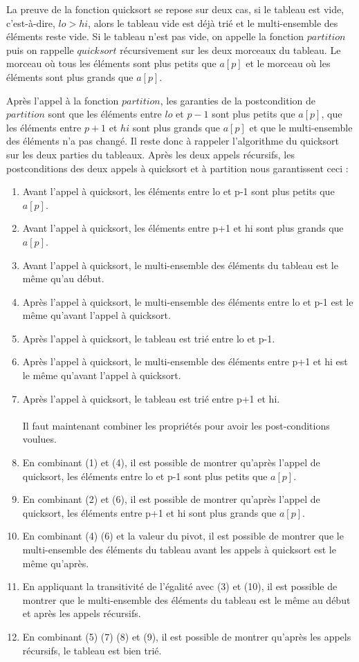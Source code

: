 \documentclass[11pt,openany]{article}
\begin{document}
		La preuve de la fonction quicksort se repose sur deux cas, si le tableau est vide, c'est-\`a-dire, $lo > hi$, alors le tableau vide est d\'ej\`a tri\'e et le multi-ensemble des \'el\'ements reste vide. Si le tableau n'est pas vide, on appelle la fonction $partition$ puis on rappelle $quicksort$ r\'ecursivement sur les deux morceaux du tableau. Le morceau o\`u tous les \'el\'ements sont plus petits que $a[p]$ et le morceau o\`u les \'el\'ements sont plus grands que $a[p]$.
		
		Apr\`es l'appel \`a la fonction $partition$, les garanties de la postcondition de $partition$ sont que les \'el\'ements entre $lo$ et $p-1$ sont plus petits que $a[p]$, que les \'el\'ements entre $p+1$ et $hi$ sont plus grands que $a[p]$ et que le multi-ensemble des \'el\'ements n'a pas chang\'e. Il reste donc \`a rappeler l'algorithme du quicksort sur les deux parties du tableaux. Apr\`es les deux appels r\'ecursifs, les postconditions des deux appels \`a quicksort et \`a partition nous garantissent ceci :
		\begin{enumerate}
			\item Avant l'appel \`a quicksort, les \'el\'ements entre lo et p-1 sont plus petits que $a[p]$.
			\item Avant l'appel \`a quicksort, les \'el\'ements entre p+1 et hi sont plus grands que $a[p]$.
			\item Avant l'appel \`a quicksort, le multi-ensemble des \'el\'ements du tableau est le m\^eme qu'au d\'ebut.
			\item Apr\`es l'appel \`a quicksort, le multi-ensemble des \'el\'ements entre lo et p-1 est le m\^eme qu'avant l'appel \`a quicksort.
			\item Apr\`es l'appel \`a quicksort, le tableau est tri\'e entre lo et p-1.
			\item Apr\`es l'appel \`a quicksort, le multi-ensemble des \'el\'ements entre p+1 et hi est le m\^eme qu'avant l'appel \`a quicksort.
			\item Apr\`es l'appel \`a quicksort, le tableau est tri\'e entre p+1 et hi.\\ \\
			Il faut maintenant combiner les propri\'et\'es pour avoir les post-conditions voulues.
			\item En combinant (1) et (4), il est possible de montrer qu'apr\`es l'appel de quicksort, les \'el\'ements entre lo et p-1 sont plus petits que $a[p]$.
			\item En combinant (2) et (6), il est possible de montrer qu'apr\`es l'appel de quicksort, les \'el\'ements entre p+1 et hi sont plus grands que $a[p]$.
			\item En combinant (4) (6) et la valeur du pivot, il est possible de montrer que le multi-ensemble des \'el\'ements du tableau avant les appels \`a quicksort est le m\^eme qu'apr\`es.
			\item En appliquant la transitivit\'e de l'\'egalit\'e avec (3) et (10), il est possible de montrer que le multi-ensemble des \'el\'ements du tableau est le m\^eme au d\'ebut et apr\`es les appels r\'ecursifs.
			\item En combinant (5) (7) (8) et (9), il est possible de montrer qu'apr\`es les appels r\'ecursifs, le tableau est bien tri\'e.
		\end{enumerate}
\end{document}
